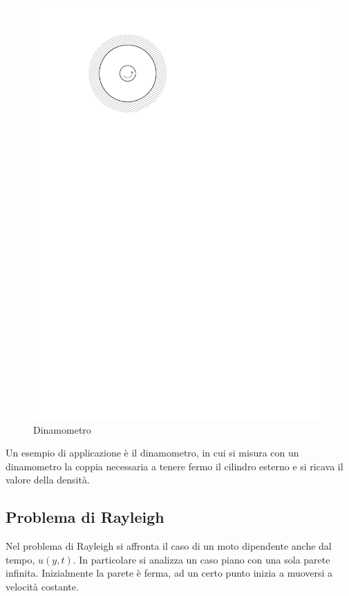 	\begin{figure}[ht]
		\includegraphics[scale=0.9]{./3.6 Soluzioni esatte equazioni di Navier-Stokes/3.6-8}
		\centering
		\caption{Dinamometro}
	\end{figure}
%
Un esempio di applicazione è il dinamometro, in cui si misura con un dinamometro la coppia necessaria a tenere fermo il cilindro esterno e si ricava il valore della densità.

 \subsection{Problema di Rayleigh}
 Nel problema di Rayleigh si affronta il caso di un moto dipendente anche dal tempo, $u(y,t)$.
In particolare si analizza un caso piano con una sola parete infinita.
Inizialmente la parete è ferma, ad un certo punto inizia a muoversi a velocità costante.


